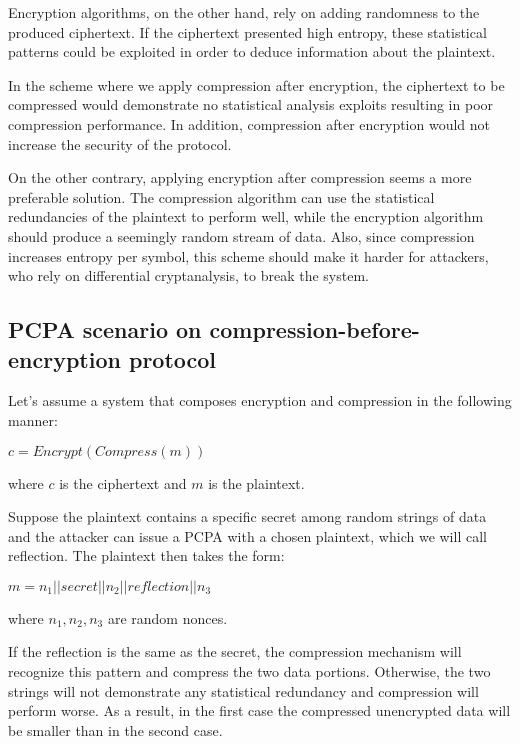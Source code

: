 Encryption algorithms, on the other hand, rely on adding randomness to the
produced ciphertext. If the ciphertext presented high entropy, these statistical
patterns could be exploited in order to deduce information about the plaintext.

In the scheme where we apply compression after encryption, the ciphertext to be
compressed would demonstrate no statistical analysis exploits resulting in
poor compression performance. In addition, compression after encryption would
not increase the security of the protocol.

On the other contrary, applying encryption after compression seems a more
preferable solution. The compression algorithm can use the statistical
redundancies of the plaintext to perform well, while the encryption algorithm
should produce a seemingly random stream of data. Also, since compression
increases entropy per symbol, this scheme should make it harder for attackers,
who rely on differential cryptanalysis, to break the system.

\subsection{PCPA scenario on compression-before-encryption protocol}

Let's assume a system that composes encryption and compression in the following
manner:

\begin{math}c = Encrypt(Compress(m))\end{math}

where \begin{math}c\end{math} is the ciphertext and \begin{math}m\end{math} is
the plaintext.

Suppose the plaintext contains a specific secret among random strings of data
and the attacker can issue a PCPA with a chosen plaintext, which we will call
reflection. The plaintext then takes the form:

\begin{math}m = n_1 || secret || n_2 || reflection || n_3\end{math}

where \begin{math}n_1, n_2, n_3\end{math} are random nonces.

If the reflection is the same as the secret, the compression mechanism will
recognize this pattern and compress the two data portions. Otherwise, the
two strings will not demonstrate any statistical redundancy and compression will
perform worse. As a result, in the first case the compressed unencrypted data
will be smaller than in the second case.

